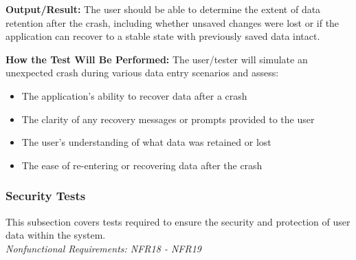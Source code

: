 \documentclass[12pt, titlepage]{article}
\begin{document}
\begin{enumerate}
\textbf{Output/Result:} The user should be able to determine the extent of data retention after 
the crash, including whether unsaved changes were lost or if the application can recover to a 
stable state with previously saved data intact.

\textbf{How the Test Will Be Performed:} The user/tester will simulate an unexpected crash during various data entry scenarios and assess:
\begin{itemize}
    \item The application's ability to recover data after a crash
    \item The clarity of any recovery messages or prompts provided to the user
    \item The user’s understanding of what data was retained or lost
    \item The ease of re-entering or recovering data after the crash
\end{itemize}

\end{enumerate}

\subsubsection{Security Tests}

This subsection covers tests required to ensure the security and protection of user data within the system. \\
\textit{Nonfunctional Requirements: NFR18 - NFR19}
\end{document}
